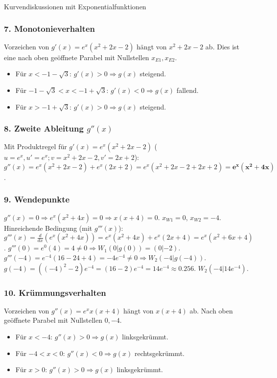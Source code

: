 \begin{loesungsumgebung}{Kurvendiskussionen mit Exponentialfunktionen}
\begin{enumerate}[label=(\alph*)]
    \subsubsection*{7. Monotonieverhalten}
    Vorzeichen von $g'(x)=e^x(x^2+2x-2)$ hängt von $x^2+2x-2$ ab. Dies ist eine nach oben geöffnete Parabel mit Nullstellen $x_{E1}, x_{E2}$.
    \begin{itemize}
        \item Für $x < -1-\sqrt{3}$: $g'(x) > 0 \Rightarrow g(x)$ steigend.
        \item Für $-1-\sqrt{3} < x < -1+\sqrt{3}$: $g'(x) < 0 \Rightarrow g(x)$ fallend.
        \item Für $x > -1+\sqrt{3}$: $g'(x) > 0 \Rightarrow g(x)$ steigend.
    \end{itemize}

    \subsubsection*{8. Zweite Ableitung $g''(x)$}
    Mit Produktregel für $g'(x)=e^x(x^2+2x-2)$ ($u=e^x, u'=e^x; v=x^2+2x-2, v'=2x+2$):
    $g''(x) = e^x(x^2+2x-2) + e^x(2x+2) = e^x(x^2+2x-2+2x+2) = \mathbf{e^x(x^2+4x)}$.

    \subsubsection*{9. Wendepunkte}
    $g''(x)=0 \Rightarrow e^x(x^2+4x)=0 \Rightarrow x(x+4)=0$.
    $x_{W1}=0$, $x_{W2}=-4$.
    Hinreichende Bedingung (mit $g'''(x)$):
    $g'''(x) = \frac{d}{dx}(e^x(x^2+4x)) = e^x(x^2+4x) + e^x(2x+4) = e^x(x^2+6x+4)$.
    $g'''(0) = e^0(4) = 4 \neq 0 \Rightarrow W_1(0|g(0)) = (0|-2)$.
    $g'''(-4) = e^{-4}(16-24+4) = -4e^{-4} \neq 0 \Rightarrow W_2(-4|g(-4))$.
    $g(-4) = ((-4)^2-2)e^{-4} = (16-2)e^{-4} = 14e^{-4} \approx 0.256$.
    $W_2(-4 | 14e^{-4})$.

    \subsubsection*{10. Krümmungsverhalten}
    Vorzeichen von $g''(x)=e^x x(x+4)$ hängt von $x(x+4)$ ab. Nach oben geöffnete Parabel mit Nullstellen $0, -4$.
    \begin{itemize}
        \item Für $x < -4$: $g''(x) > 0 \Rightarrow g(x)$ linksgekrümmt.
        \item Für $-4 < x < 0$: $g''(x) < 0 \Rightarrow g(x)$ rechtsgekrümmt.
        \item Für $x > 0$: $g''(x) > 0 \Rightarrow g(x)$ linksgekrümmt.
    \end{itemize}


\end{enumerate}
\end{loesungsumgebung}

